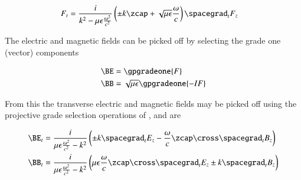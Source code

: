 \begin{equation}\label{eqn:transverseField:48}
\begin{aligned}
F_t &= \frac{i}{k^2 - \mu\epsilon\frac{\omega^2}{c^2}} \left( \pm k \zcap + \sqrt{\mu\epsilon}\frac{\omega}{c}\right) \spacegrad_t F_z
\end{aligned}
\end{equation}

The electric and magnetic fields can be picked off by selecting the grade one (vector) components

\begin{equation}\label{eqn:transverseField:8}
\begin{aligned}
\BE &= \gpgradeone{F} \\
\BB &= \sqrt{\mu\epsilon} \gpgradeone{-I F}
\end{aligned}
\end{equation}


From this the transverse electric and magnetic fields may be picked off using the projective grade selection operations of , and are

\begin{equation}\label{eqn:transverseField:68}
\begin{aligned}
\BE_t &= \frac{i}{\mu\epsilon\frac{\omega^2}{c^2} -k^2} \left( \pm k \spacegrad_t E_z - \frac{\omega}{c} \zcap \cross \spacegrad_t B_z \right) \\
\BB_t &= \frac{i}{\mu\epsilon\frac{\omega^2}{c^2} -k^2} \left( {\mu\epsilon}\frac{\omega}{c} \zcap \cross \spacegrad_t E_z \pm k \spacegrad_t B_z \right)
\end{aligned}
\end{equation}
